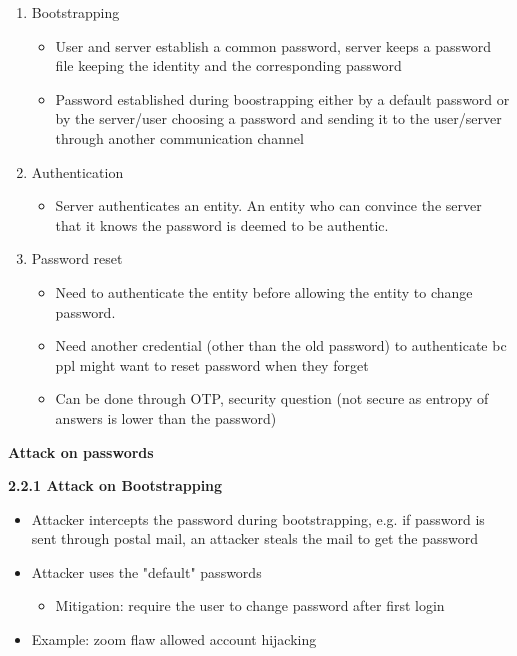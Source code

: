 \documentclass[landscape,a4paper]{extarticle}
\begin{document}
\begin{multicols*}{5}
    \begin{enumerate}
        \item Bootstrapping
        \begin{itemize}
            \item User and server establish a common password, server keeps a password file keeping the 
            identity and the corresponding password
            \item Password established during boostrapping either by a default password
            or by the server/user choosing a password and sending it to the user/server through another
            communication channel
        \end{itemize}
        \item Authentication
        \begin{itemize}
            \item Server authenticates an entity. An entity who can convince the server that it knows
            the password is deemed to be authentic.
        \end{itemize}
        \item Password reset
        \begin{itemize}
            \item Need to authenticate the entity before allowing the entity to change password.
            \item Need another credential (other than the old password) to authenticate bc ppl might 
            want to reset password when they forget
            \item Can be done through OTP, security question (not secure as entropy of answers is 
            lower than the password)
        \end{itemize}
    \end{enumerate}

    \textbf{Attack on passwords}

    \textbf{2.2.1 Attack on Bootstrapping}
    \begin{itemize}
        \item Attacker intercepts the password during bootstrapping, e.g. if password
        is sent through postal mail, an attacker steals the mail to get the password
        \item Attacker uses the "default" passwords
        \begin{itemize}
            \item Mitigation: require the user to change password after first login
        \end{itemize}
        \item Example: zoom flaw allowed account hijacking
    \end{itemize}


\end{multicols*}
\end{document}
